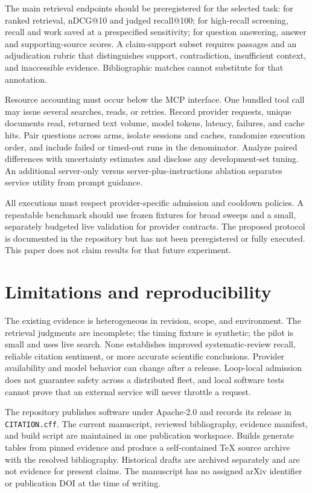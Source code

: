 \documentclass[11pt]{article}
\begin{document}
The main retrieval endpoints should be preregistered for the selected task:
for ranked retrieval, nDCG@10 and judged recall@100; for high-recall screening,
recall and work saved at a prespecified sensitivity; for question answering,
answer and supporting-source scores. A claim-support subset requires passages
and an adjudication rubric that distinguishes support, contradiction, insufficient
context, and inaccessible evidence. Bibliographic matches cannot substitute for
that annotation.

Resource accounting must occur below the MCP interface. One bundled tool call
may issue several searches, reads, or retries. Record provider requests, unique
documents read, returned text volume, model tokens, latency, failures, and cache
hits. Pair questions across arms, isolate sessions and caches, randomize execution
order, and include failed or timed-out runs in the denominator. Analyze paired
differences with uncertainty estimates and disclose any development-set tuning.
An additional server-only versus server-plus-instructions ablation separates
service utility from prompt guidance.

All executions must respect provider-specific admission and cooldown policies.
A repeatable benchmark should use frozen fixtures for broad sweeps and a small,
separately budgeted live validation for provider contracts. The proposed protocol
is documented in the repository but has not been preregistered or fully executed.
This paper does not claim results for that future experiment.

\section{Limitations and reproducibility}
The existing evidence is heterogeneous in revision, scope, and environment. The
retrieval judgments are incomplete; the timing fixture is synthetic; the pilot
is small and uses live search. None establishes improved systematic-review recall,
reliable citation sentiment, or more accurate scientific conclusions. Provider
availability and model behavior can change after a release. Loop-local admission
does not guarantee safety across a distributed fleet, and local software tests
cannot prove that an external service will never throttle a request.

The repository publishes software under Apache-2.0 and records its release in
\texttt{CITATION.cff}. The current manuscript, reviewed bibliography, evidence
manifest, and build script are maintained in one publication workspace. Builds
generate tables from pinned evidence and produce a self-contained TeX source
archive with the resolved bibliography. Historical drafts are archived separately
and are not evidence for present claims. The manuscript has no assigned arXiv
identifier or publication DOI at the time of writing.
\end{document}
